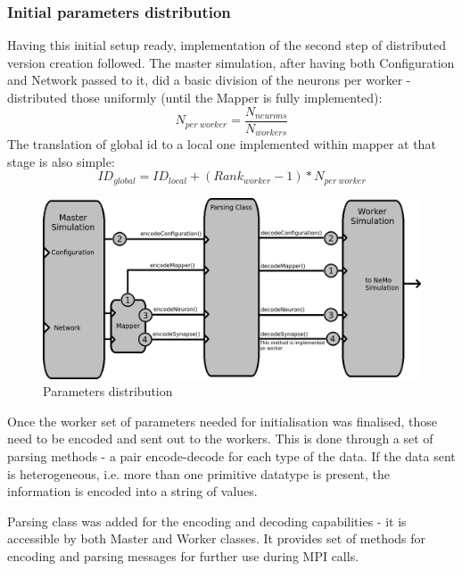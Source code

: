\subsubsection{Initial parameters distribution}

Having this initial setup ready, implementation of the second step of distributed version creation followed.
The master simulation, after having both Configuration and Network passed to it, did a basic division of the neurons per worker - distributed those uniformly (until the Mapper is fully implemented):
\begin{equation}N_{per\ worker} = \frac{N_{neurons}}{N_{workers}}\end{equation}
The translation of global id to a local one implemented within mapper at that stage is also simple:
\begin{equation}ID_{global} = ID_{local} + (Rank_{worker}-1)*N_{per\ worker}\end{equation}

\begin{figure}[h]
\begin{center}
\includegraphics[scale = 0.5]{images/distribution.png}
\end{center}
\caption{Parameters distribution}
\end{figure}

Once the worker set of parameters needed for initialisation was finalised, those need to be encoded and sent out to the workers. This is done through a set of parsing methods - a pair encode-decode for each type of the data. If the data sent is heterogeneous, i.e. more than one primitive datatype is present, the information is encoded into a string of values.

Parsing class was added for the encoding and decoding capabilities - it is accessible by both Master and Worker classes. It provides set of methods for encoding and parsing messages for further use during MPI calls.

